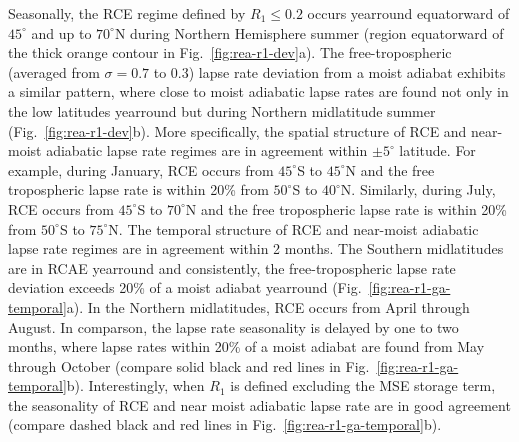 \documentclass{ametsocV5}
\begin{document}
    Seasonally, the RCE regime defined by $R_1 \le 0.2$ occurs yearround equatorward of $45^\circ$ and up to $70^\circ$N during Northern Hemisphere summer (region equatorward of the thick orange contour in Fig.~\ref{fig:rea-r1-dev}a). The free-tropospheric (averaged from $\sigma=0.7$ to 0.3) lapse rate deviation from a moist adiabat exhibits a similar pattern, where close to moist adiabatic lapse rates are found not only in the low latitudes yearround but during Northern midlatitude summer (Fig.~\ref{fig:rea-r1-dev}b). More specifically, the spatial structure of RCE and near-moist adiabatic lapse rate regimes are in agreement within $\pm5^\circ$ latitude. For example, during January, RCE occurs from $45^\circ$S to $45^\circ$N and the free tropospheric lapse rate is within 20\% from $50^\circ$S to $40^\circ$N. Similarly, during July, RCE occurs from $45^\circ$S to $70^\circ$N and the free tropospheric lapse rate is within 20\% from $50^\circ$S to $75^\circ$N. The temporal structure of RCE and near-moist adiabatic lapse rate regimes are in agreement within 2 months. The Southern midlatitudes are in RCAE yearround and consistently, the free-tropospheric lapse rate deviation exceeds 20\% of a moist adiabat yearround (Fig.~\ref{fig:rea-r1-ga-temporal}a). In the Northern midlatitudes, RCE occurs from April through August. In comparson, the lapse rate seasonality is delayed by one to two months, where lapse rates within 20\% of a moist adiabat are found from May through October (compare solid black and red lines in Fig.~\ref{fig:rea-r1-ga-temporal}b). Interestingly, when $R_1$ is defined excluding the MSE storage term, the seasonality of RCE and near moist adiabatic lapse rate are in good agreement (compare dashed black and red lines in Fig.~\ref{fig:rea-r1-ga-temporal}b).
\end{document}
